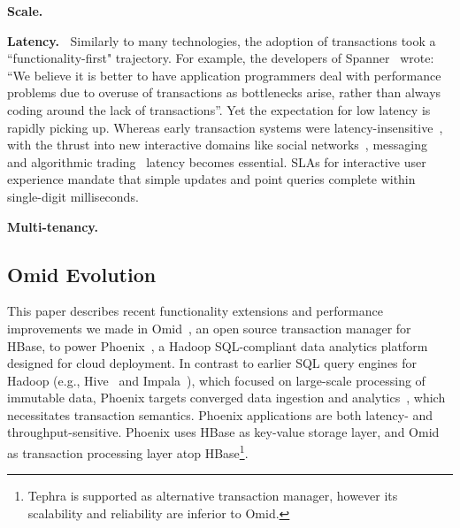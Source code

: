 {\bf Scale.\ } 
{}

{\bf Latency.\ }
Similarly to many technologies, the adoption of transactions took a  ``functionality-first" trajectory. 
For example, the developers of Spanner~\cite{Spanner2012} wrote: 
  ``We believe it
is better to have application programmers deal with performance problems due to overuse 
of transactions as bottlenecks arise, rather than always coding around the lack of transactions''. 
Yet the expectation for low latency is rapidly picking up. 
Whereas early transaction systems were  latency-insensitive~\cite{Percolator2010, Omid2017}, 
with the thrust into new interactive domains like social networks~\cite{chatter},  
messaging~\cite{Borthakur:2011} and algorithmic trading~\cite{opentsdb} latency becomes essential.  
SLAs for interactive user experience mandate that simple updates and point queries  complete within 
single-digit milliseconds. {}

{\bf Multi-tenancy.\ } {}

\subsection{Omid Evolution }
This paper describes recent functionality extensions and performance improvements 
we made in Omid~\cite{omid}, an open source transaction manager for HBase, to power 
Phoenix~\cite{phoenix},  a Hadoop SQL-compliant  data analytics platform designed 
for cloud deployment. In contrast to earlier SQL query engines for Hadoop (e.g., 
Hive~\cite{hive} and Impala~\cite{impala}), which focused on large-scale processing
of immutable data, Phoenix targets converged data ingestion and analytics~\cite{PhoenixUseCases},
which necessitates transaction semantics. Phoenix
applications are both latency- and throughput-sensitive. Phoenix uses HBase 
as key-value storage layer, and Omid as transaction processing layer atop HBase\footnote{\small{Tephra 
is supported as alternative transaction manager, however its scalability and reliability are inferior to Omid.}}. 

